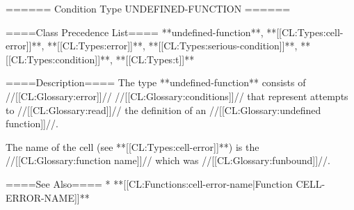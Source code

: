 ====== Condition Type UNDEFINED-FUNCTION ======

====Class Precedence List====
**undefined-function**, **[[CL:Types:cell-error]]**, **[[CL:Types:error]]**, **[[CL:Types:serious-condition]]**, **[[CL:Types:condition]]**, **[[CL:Types:t]]**

====Description====
The type **undefined-function** consists of //[[CL:Glossary:error]]// //[[CL:Glossary:conditions]]// that represent attempts to //[[CL:Glossary:read]]// the definition of an //[[CL:Glossary:undefined function]]//.

The name of the cell (see **[[CL:Types:cell-error]]**) is the //[[CL:Glossary:function name]]// which was //[[CL:Glossary:funbound]]//.

====See Also====
  * **[[CL:Functions:cell-error-name|Function CELL-ERROR-NAME]]**

